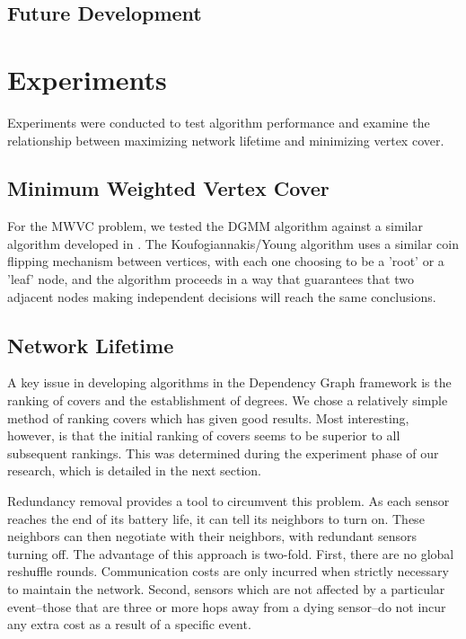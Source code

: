 \subsection{Future Development}
\label{sec:sim-future}

\section{Experiments}
\label{sec:experiments}
Experiments were conducted to test algorithm performance and examine the relationship between maximizing network lifetime and minimizing vertex cover.
\subsection{Minimum Weighted Vertex Cover}
\label{sub:mwvc-exp}

For the MWVC problem, we tested the DGMM algorithm against a similar algorithm developed in \cite{1582746}. The Koufogiannakis/Young algorithm uses a similar coin flipping mechanism between vertices, with each one choosing to be a 'root' or a 'leaf' node, and the algorithm proceeds in a way that guarantees that two adjacent nodes making independent decisions will reach the same conclusions. 

\subsection{Network Lifetime}

A key issue in developing algorithms in the Dependency Graph framework is the ranking of covers and the establishment of degrees. We chose a relatively simple method of ranking covers which has given good results. Most interesting, however, is that the initial ranking of covers seems to be superior to all subsequent rankings. This was determined during the experiment phase of our research, which is detailed in the next section.

Redundancy removal provides a tool to circumvent this problem. As each sensor reaches the end of its battery life, it can tell its neighbors to turn on. These neighbors can then negotiate with their neighbors, with redundant sensors turning off. The advantage of this approach is two-fold. First, there are no global reshuffle rounds. Communication costs are only incurred when strictly necessary to maintain the network. Second, sensors which are not affected by a particular event--those that are three or more hops away from a dying sensor--do not incur any extra cost as a result of a specific event.

